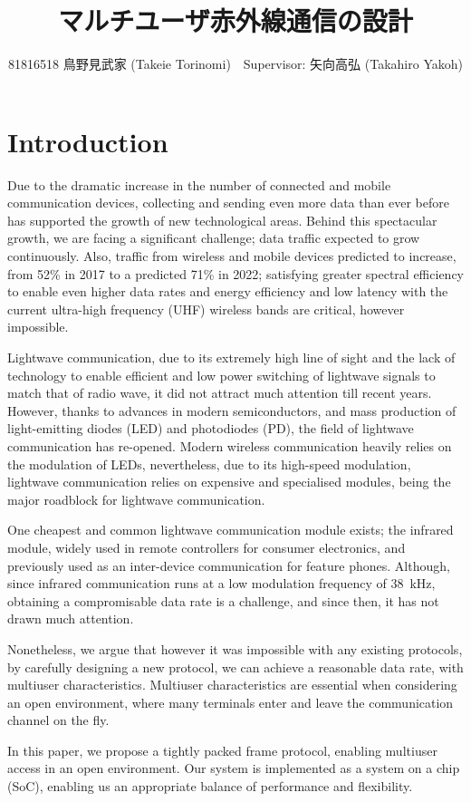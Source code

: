 ﻿\documentclass[twocolumn,9pt]{ltjsarticle}
\title{マルチユーザ赤外線通信の設計}
\author{81816518 鳥野見武家 (Takeie Torinomi)　Supervisor: 矢向高弘 (Takahiro Yakoh)}
\begin{document}
\maketitle
\section{Introduction}
Due to the dramatic increase in the number of connected and mobile communication devices, collecting and sending even more data than ever before has supported the growth of new technological areas.
Behind this spectacular growth, we are facing a significant challenge; data traffic expected to grow continuously.
Also, traffic from wireless and mobile devices predicted to increase, from 52\% in 2017 to a predicted 71\% in 2022; satisfying greater spectral efficiency to enable even higher data rates and energy efficiency and low latency with the current ultra-high frequency (UHF) wireless bands are critical, however impossible.

Lightwave communication, due to its extremely high line of sight and the lack of technology to enable efficient and low power switching of lightwave signals to match that of radio wave, it did not attract much attention till recent years.
However, thanks to advances in modern semiconductors, and mass production of light-emitting diodes (LED) and photodiodes (PD), the field of lightwave communication has re-opened.
Modern wireless communication heavily relies on the modulation of LEDs, nevertheless, due to its high-speed modulation, lightwave communication relies on expensive and specialised modules, being the major roadblock for lightwave communication.

One cheapest and common lightwave communication module exists; the infrared module, widely used in remote controllers for consumer electronics, and previously used as an inter-device communication for feature phones.
Although, since infrared communication runs at a low modulation frequency of \SI{38}{kHz}, obtaining a compromisable data rate is a challenge, and since then, it has not drawn much attention.

Nonetheless, we argue that however it was impossible with any existing protocols, by carefully designing a new protocol, we can achieve a reasonable data rate, with multiuser characteristics.
Multiuser characteristics are essential when considering an open environment, where many terminals enter and leave the communication channel on the fly.

In this paper, we propose a tightly packed frame protocol, enabling multiuser access in an open environment.
Our system is implemented as a system on a chip (SoC), enabling us an appropriate balance of performance and flexibility.
\end{document}
